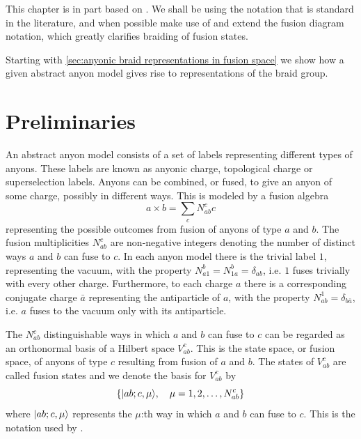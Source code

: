 \documentclass[a4paper,10pt,oneside]{book}
\theoremstyle{plain}
\theoremstyle{definition}
\theoremstyle{remark}
\DeclarePairedDelimiter\ket{\lvert}{\rangle}
\begin{document}
This chapter is in part based on \cite{preskill,kitaev,bonderson}. We shall be using the notation that is standard in the literature, and when possible make use of and extend the fusion diagram notation, which greatly clarifies braiding of fusion states.

Starting with \cref{sec:anyonic braid representations in fusion space} we show how a given abstract anyon model gives rise to representations of the braid group.

\section{Preliminaries}

An abstract anyon model consists of a set of labels representing different types of anyons. These labels are known as anyonic charge, topological charge or superselection labels. Anyons can be combined, or fused, to give an anyon of some charge, possibly in different ways. This is modeled by a fusion algebra
\begin{equation}
  a \times b = \sum_c N_{ab}^c c
\end{equation}
representing the possible outcomes from fusion of anyons of type $a$ and $b$. The fusion multiplicities $N_{ab}^c$ are non-negative integers denoting the number of distinct ways $a$ and $b$ can fuse to $c$. In each anyon model there is the trivial label $1$, representing the vacuum, with the property $N_{a1}^b = N_{1a}^b = \delta_{ab}$, i.e. $1$ fuses trivially with every other charge. Furthermore, to each charge $a$ there is a corresponding conjugate charge $\bar{a}$ representing the antiparticle of $a$, with the property $N_{ab}^1 = \delta_{b\bar{a}}$, i.e. $a$ fuses to the vacuum only with its antiparticle.



The $N_{ab}^c$ distinguishable ways in which $a$ and $b$ can fuse to $c$ can be regarded as an orthonormal basis of a Hilbert space $V_{ab}^c$. This is the state space, or fusion space, of anyons of type $c$ resulting from fusion of $a$ and $b$. The states of $V_{ab}^c$ are called fusion states and we denote the basis for $V_{ab}^c$ by
\begin{equation}
  \{ \ket{ab;c,\mu}, \quad \mu = 1,2,\ldots,N_{ab}^c \}
\end{equation}
where $\ket{ab;c,\mu}$ represents the $\mu$:th way in which $a$ and $b$ can fuse to $c$. This is the notation used by \cite{preskill}.
\end{document}
